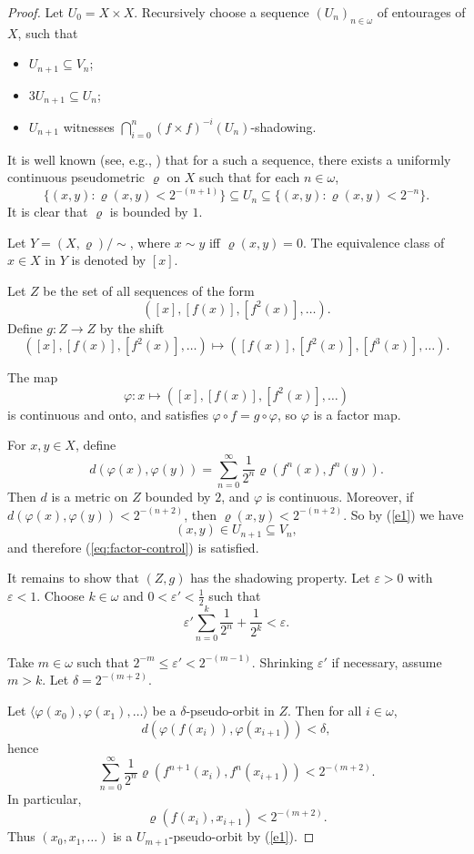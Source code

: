 \documentclass[10pt,a4paper]{amsart}
\numberwithin{equation}{section}
\begin{document}
\begin{proof}
Let $U_0=X\times X$. 
Recursively choose a sequence $(U_n)_{n\in \omega}$ of entourages of $X$, such that 
\begin{itemize}
\item $U_{n+1}\subseteq V_n$;
\item $3U_{n+1}\subseteq {U_n}$;
\item $U_{n+1}$ witnesses $\bigcap_{i=0}^n (f\times f)^{-i}(U_n)$-shadowing.
\end{itemize}

It is well known (see, e.g., \cite[Theorem 8.1.10]{Eng}) that for a such a sequence, there exists a uniformly continuous pseudometric $\varrho$ on $X$ such that for each $n\in \omega$,
\begin{equation}\label{e1}
\{(x,y):\varrho(x,y)<2^{-(n+1)}\}
\subseteq U_n
\subseteq \{(x,y):\varrho(x,y)<2^{-n}\}.
\end{equation}
It is clear that $\varrho$ is bounded by $1$.

Let $Y=(X,\varrho)/\sim$, where $x\sim y$ iff $\varrho(x,y)=0$. The equivalence class of $x\in X$ in $Y$ is denoted by $[x]$.

Let $Z$ be the set of all sequences of the form
\[
( [x],[f(x)],[f^2(x)],\ldots).
\]
Define $g:Z\to Z$ by the shift
\[
([x],[f(x)],[f^2(x)],\ldots)
\mapsto
([f(x)],[f^2(x)],[f^3(x)],\ldots).
\]

The map
\[
\varphi:x\mapsto ( [x],[f(x)],[f^2(x)],\ldots)
\]
is continuous and onto, and satisfies $\varphi\circ f=g\circ \varphi$, 
so $\varphi$ is a factor map.

For $x,y\in X$, define
\[
d(\varphi(x),\varphi(y))
=\sum_{n=0}^\infty \frac{1}{2^n}\varrho(f^n(x),f^n(y)).
\]
Then $d$ is a metric on $Z$ bounded by $2$, and $\varphi$ is continuous.
Moreover, if $d(\varphi(x), \varphi(y))<2^{-(n+2)}$, then $\varrho(x, y)<2^{-(n+2)}$. So by (\ref{e1}) we have 
\[(x, y)\in U_{n+1}\subseteq V_n,\]
 and therefore (\ref{eq:factor-control}) is satisfied.

It remains to show that $(Z,g)$ has the shadowing property. 
Let $\varepsilon>0$ with $\varepsilon<1$. 
Choose $k\in \omega$ and $0<\varepsilon'<\tfrac{1}{2}$ such that
\[
\varepsilon'\sum_{n=0}^k \frac{1}{2^n}+\frac{1}{2^k}<\varepsilon.
\]

Take $m\in \omega$ such that $2^{-m}\le \varepsilon'<2^{-(m-1)}$. 
Shrinking $\varepsilon'$ if necessary, assume $m>k$. 
Let 
$
\delta=2^{-(m+2)}.
$

Let $\langle \varphi(x_0),\varphi(x_1),\ldots\rangle$ be a $\delta$-pseudo-orbit in $Z$. 
Then for all $i\in \omega$,
\[
d(\varphi(f(x_i)),\varphi(x_{i+1}))<\delta,
\]
hence
\[
\sum_{n=0}^\infty \frac{1}{2^n}\varrho(f^{n+1}(x_i),f^n(x_{i+1}))<2^{-(m+2)}.
\]
In particular,
\[
\varrho(f(x_i),x_{i+1})<2^{-(m+2)}.
\]
Thus $(x_0,x_1,\ldots)$ is a $U_{m+1}$-pseudo-orbit by (\ref{e1}).


\end{proof}
\end{document}

